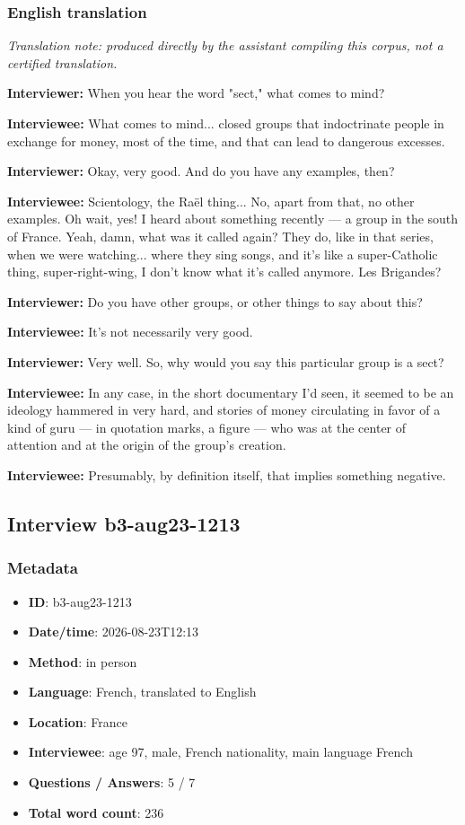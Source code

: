 \subsubsection*{English translation}
\textit{Translation note: produced directly by the assistant compiling this corpus, not a certified translation.}

\textbf{Interviewer:} When you hear the word "sect," what comes to mind?

\textbf{Interviewee:} What comes to mind... closed groups that indoctrinate people in exchange for money, most of the time, and that can lead to dangerous excesses.

\textbf{Interviewer:} Okay, very good. And do you have any examples, then?

\textbf{Interviewee:} Scientology, the Raël thing... No, apart from that, no other examples. Oh wait, yes! I heard about something recently — a group in the south of France. Yeah, damn, what was it called again? They do, like in that series, when we were watching... where they sing songs, and it's like a super-Catholic thing, super-right-wing, I don't know what it's called anymore. Les Brigandes?

\textbf{Interviewer:} Do you have other groups, or other things to say about this?

\textbf{Interviewee:} It's not necessarily very good.

\textbf{Interviewer:} Very well. So, why would you say this particular group is a sect?

\textbf{Interviewee:} In any case, in the short documentary I'd seen, it seemed to be an ideology hammered in very hard, and stories of money circulating in favor of a kind of guru — in quotation marks, a figure — who was at the center of attention and at the origin of the group's creation.

\textbf{Interviewee:} Presumably, by definition itself, that implies something negative.

\subsection{Interview b3-aug23-1213}\label{int:b3-aug23-1213}
\subsubsection*{Metadata}
\begin{itemize}
  \item \textbf{ID}: b3-aug23-1213
  \item \textbf{Date/time}: 2026-08-23T12:13
  \item \textbf{Method}: in person
  \item \textbf{Language}: French, translated to English
  \item \textbf{Location}: France
  \item \textbf{Interviewee}: age 97, male, French nationality, main language French
  \item \textbf{Questions / Answers}: 5 / 7
  \item \textbf{Total word count}: 236
\end{itemize}
